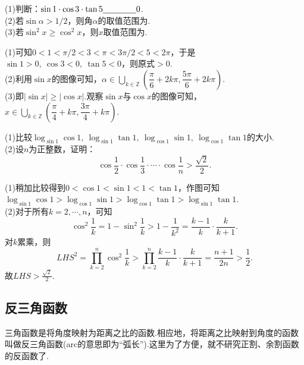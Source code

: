 \documentclass[lang=cn, zihao=5]{elegantbook}
\newcommand{\ssb}[1]{\left( #1 \right)}
\newcommand{\tk}{\uline{\hspace{4em}}}
\begin{document}
\begin{example}
	(1)判断：$\sin 1 \cdot \cos 3 \cdot \tan 5 \tk 0$. \\
	(2)若$\sin \alpha > 1/2$，则角$\alpha$的取值范围为\tk . \\
	(3)若$\sin ^2 x \geq \cos ^2 x$，则$x$取值范围为\tk . \\
\end{example}
\begin{solution}
	(1)可知$0<1<\pi /2<3<\pi <3\pi /2 <5 < 2\pi$，于是$\sin 1 >0,~\cos 3<0,~\tan 5<0$，则原式$>0$. \\
	(2)利用$\sin x$的图像可知，$\alpha \in \bigcup_{k \in \mathbb{Z}} \ssb{\dfrac{\pi}{6}+2k\pi ,\dfrac{5\pi}{6}+2k\pi }$. \\
	(3)即$|\sin x| \geq |\cos x|$.观察$\sin x$与$\cos x$的图像可知，$x \in \bigcup_{k \in \mathbb{Z}} \ssb{\dfrac{\pi}{4}+k\pi ,\dfrac{3\pi}{4}+k\pi}$.
\end{solution}

\begin{example}
	(1)比较$\log_{\sin 1} \cos 1,~\log_{\sin 1} \tan 1,~\log_{\cos 1} \sin 1,~\log_{\cos 1} \tan 1$的大小. \\
	(2)设$n$为正整数，证明：$$\cos \frac{1}{2} \cdot \cos \frac{1}{3} \cdot \cdots \cdot \cos \frac{1}{n} > \frac{\sqrt{2}}{2}.$$
\end{example}
\begin{solution}
	(1)稍加比较得到$0 < \cos 1 < \sin 1 < 1 < \tan 1$，作图可知$\log_{\sin 1} \cos 1 > \log_{\cos 1} \sin 1 > \log_{\cos 1} \tan 1 > \log_{\sin 1} \tan 1$. \\
	(2)对于所有$k=2,\cdots ,n$，可知$$\cos ^2 \frac{1}{k} = 1 - \sin ^2 \frac{1}{k} > 1-\frac{1}{k^2} = \frac{k-1}{k} \cdot \frac{k}{k+1}.$$
	对$k$累乘，则$$LHS^2 = \prod_{k=2}^{n} \cos ^2 \frac{1}{k} > \prod_{k=2}^{n} \frac{k-1}{k} \cdot \frac{k}{k+1} = \frac{n+1}{2n} > \frac{1}{2}.$$
	故$LHS > \frac{\sqrt{2}}{2}$.
\end{solution}


\subsection{反三角函数}

三角函数是将角度映射为距离之比的函数.相应地，将距离之比映射到角度的函数叫做反三角函数(arc的意思即为“弧长”).这里为了方便，就不研究正割、余割函数的反函数了.
\end{document}
